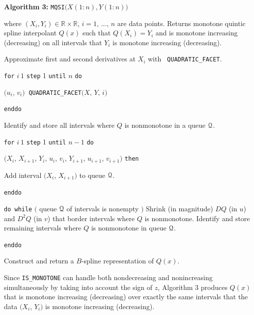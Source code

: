 \begin{plain}
\parskip=0pt
\vskip 3mm
{\parindent 0mm
{\bf Algorithm 3:} {\tt MQSI}$\bigl(X(1{:}n), Y(1{:}n) \bigr)$

where $(X_i,Y_i) \in \mathbb{R}\times\mathbb{R}$, $i = 1$, $\ldots$, $n$ are data
points. Returns monotone quintic spline interpolant $Q(x)$ such that
$Q(X_i) = Y_i$ and is monotone increasing (decreasing) on all
intervals that $Y_i$ is monotone increasing (decreasing).

}
{\parindent=6mm
\item{} Approximate first and second derivatives at $X_i$ with {\tt
  QUADRATIC\_FACET}.
\item{} {\tt for} $i\:1$ {\tt step} 1 {\tt until} $n$ {\tt do}
\item{} \codent $(u_i$, $v_i)\:$ {\tt QUADRATIC\_FACET}$(X$, $Y$, $i)$
\item{} {\tt enddo}
\item{} Identify and store all intervals where $Q$ is nonmonotone in a
queue $\cal Q$.
\item{} {\tt for} $i\:1$ {\tt step} 1 {\tt until} $n-1$ {\tt do}
\item{} $(X_i$, $X_{i+1}$, $Y_i$, $u_i$,
$v_i$, $Y_{i+1}$, $u_{i+1}$, $v_{i+1})$ {\tt then}
\item{} \codent\codent Add interval $\bigl(X_i$, $X_{i+1}\bigr)$ to
queue $\cal Q$.
\item{} 
\item{} {\tt enddo}
\item{} {\tt do while} $\bigl($ queue $\cal Q$ of intervals is nonempty $\bigr)$
\itemitem{} Shrink (in magnitude) $DQ$ (in $u$) and $D^2Q$ (in $v$)
  that border intervals where $Q$ is nonmonotone.  
\itemitem{} Identify and store remaining intervals where $Q$ is
  nonmonotone in queue $\cal Q$.
\item{} {\tt enddo}
\item{} Construct and return a $B$-spline representation of $Q(x)$.
}
\vskip 3mm
\end{plain}

Since {\tt IS\_MONOTONE} can handle both nondecreasing and
nonincreasing simultaneously by taking into account the sign of $z$,
Algorithm 3 produces $Q(x)$ that is monotone increasing (decreasing)
over exactly the same intervals that the data $(X_i$, $Y_i)$ is
monotone increasing (decreasing).

